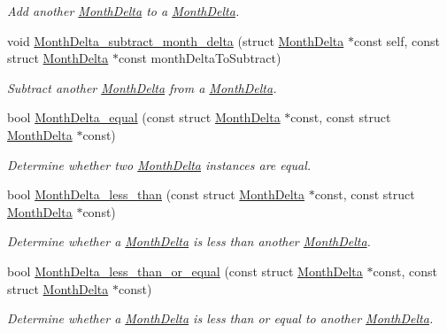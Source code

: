 \begin{DoxyCompactItemize}
\begin{DoxyCompactList}\small\item\em \-Add another \hyperlink{structMonthDelta}{\-Month\-Delta} to a \hyperlink{structMonthDelta}{\-Month\-Delta}. \end{DoxyCompactList}\item 
void \hyperlink{month-delta_8h_aba1962383fdb09d60f24b863ee738982}{\-Month\-Delta\-\_\-subtract\-\_\-month\-\_\-delta} (struct \hyperlink{structMonthDelta}{\-Month\-Delta} $\ast$const self, const struct \hyperlink{structMonthDelta}{\-Month\-Delta} $\ast$const month\-Delta\-To\-Subtract)
\begin{DoxyCompactList}\small\item\em \-Subtract another \hyperlink{structMonthDelta}{\-Month\-Delta} from a \hyperlink{structMonthDelta}{\-Month\-Delta}. \end{DoxyCompactList}\item 
bool \hyperlink{month-delta_8h_a346d0c310255f1f720506a15446497a3}{\-Month\-Delta\-\_\-equal} (const struct \hyperlink{structMonthDelta}{\-Month\-Delta} $\ast$const, const struct \hyperlink{structMonthDelta}{\-Month\-Delta} $\ast$const)
\begin{DoxyCompactList}\small\item\em \-Determine whether two \hyperlink{structMonthDelta}{\-Month\-Delta} instances are equal. \end{DoxyCompactList}\item 
bool \hyperlink{month-delta_8h_ac38bd594e6541d7943021c7fcf337c9d}{\-Month\-Delta\-\_\-less\-\_\-than} (const struct \hyperlink{structMonthDelta}{\-Month\-Delta} $\ast$const, const struct \hyperlink{structMonthDelta}{\-Month\-Delta} $\ast$const)
\begin{DoxyCompactList}\small\item\em \-Determine whether a \hyperlink{structMonthDelta}{\-Month\-Delta} is less than another \hyperlink{structMonthDelta}{\-Month\-Delta}. \end{DoxyCompactList}\item 
bool \hyperlink{month-delta_8h_a6aa021d2410c395010cb579eb49249db}{\-Month\-Delta\-\_\-less\-\_\-than\-\_\-or\-\_\-equal} (const struct \hyperlink{structMonthDelta}{\-Month\-Delta} $\ast$const, const struct \hyperlink{structMonthDelta}{\-Month\-Delta} $\ast$const)
\begin{DoxyCompactList}\small\item\em \-Determine whether a \hyperlink{structMonthDelta}{\-Month\-Delta} is less than or equal to another \hyperlink{structMonthDelta}{\-Month\-Delta}. \end{DoxyCompactList}\item 

\end{DoxyCompactItemize}
